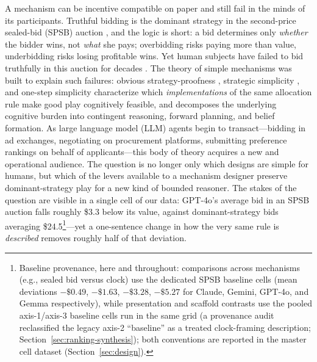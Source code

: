 A mechanism can be incentive compatible on paper and still fail in the minds of its participants. Truthful bidding is the dominant strategy in the second-price sealed-bid (SPSB) auction \citep{vickrey1961counterspeculation}, and the logic is short: a bid determines only \emph{whether} the bidder wins, not \emph{what} she pays; overbidding risks paying more than value, underbidding risks losing profitable wins. Yet human subjects have failed to bid truthfully in this auction for decades \citep{kagel1993independent, kagel1995individual}. The theory of simple mechanisms was built to explain such failures: obvious strategy-proofness \citep{li2017obviously}, strategic simplicity \citep{borgers2019strategically}, and one-step simplicity \citep{pycia2023theory} characterize which \emph{implementations} of the same allocation rule make good play cognitively feasible, and \citet{li2024designing} decomposes the underlying cognitive burden into contingent reasoning, forward planning, and belief formation. As large language model (LLM) agents begin to transact---bidding in ad exchanges, negotiating on procurement platforms, submitting preference rankings on behalf of applicants---this body of theory acquires a new and operational audience. The question is no longer only which designs are simple for humans, but which of the levers available to a mechanism designer preserve dominant-strategy play for a new kind of bounded reasoner. The stakes of the question are visible in a single cell of our data: GPT-4o's average bid in an SPSB auction falls roughly \$3.3 below its value, against dominant-strategy bids averaging \$24.5\footnote{Baseline provenance, here and throughout: comparisons across mechanisms (e.g., sealed bid versus clock) use the dedicated SPSB baseline cells (mean deviations $-\$0.49$, $-\$1.63$, $-\$3.28$, $-\$5.27$ for Claude, Gemini, GPT-4o, and Gemma respectively), while presentation and scaffold contrasts use the pooled axis-1/axis-3 baseline cells run in the same grid (a provenance audit reclassified the legacy axis-2 ``baseline'' as a treated clock-framing description; Section~\ref{sec:ranking-synthesis}); both conventions are reported in the master cell dataset (Section~\ref{sec:design}).}---yet a one-sentence change in how the very same rule is \emph{described} removes roughly half of that deviation.

